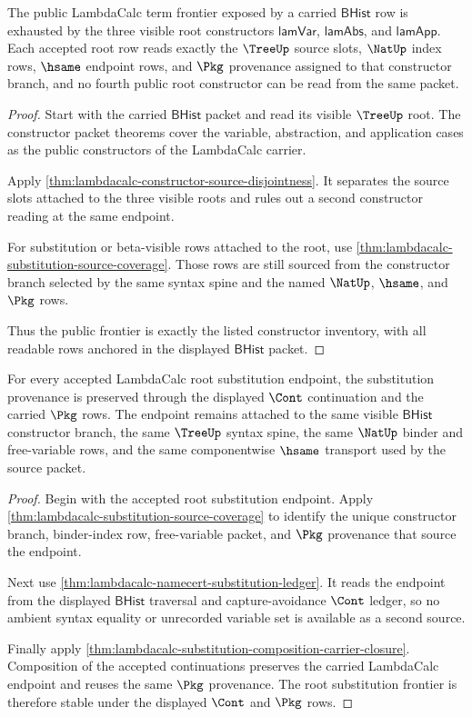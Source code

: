 \begin{theorem}
\label{thm:lambdacalc-root-constructor-frontier}
The public LambdaCalc term frontier exposed by a carried $\mathsf{BHist}$ row is
exhausted by the three visible root constructors
$\mathsf{lamVar}$, $\mathsf{lamAbs}$, and $\mathsf{lamApp}$. Each accepted root
row reads exactly the $\TreeUp$ source slots, $\NatUp$ index rows, $\hsame$
endpoint rows, and $\Pkg$ provenance assigned to that constructor branch, and no
fourth public root constructor can be read from the same packet.
\end{theorem}
\begin{proof}
Start with the carried $\mathsf{BHist}$ packet and read its visible $\TreeUp$
root. The constructor packet theorems cover the variable, abstraction, and
application cases as the public constructors of the LambdaCalc carrier.

Apply \autoref{thm:lambdacalc-constructor-source-disjointness}. It separates the
source slots attached to the three visible roots and rules out a second
constructor reading at the same endpoint.

For substitution or beta-visible rows attached to the root, use
\autoref{thm:lambdacalc-substitution-source-coverage}. Those rows are still
sourced from the constructor branch selected by the same syntax spine and the
named $\NatUp$, $\hsame$, and $\Pkg$ rows.

Thus the public frontier is exactly the listed constructor inventory, with all
readable rows anchored in the displayed $\mathsf{BHist}$ packet.
\end{proof}

\begin{theorem}
\label{thm:lambdacalc-root-substitution-frontier}
For every accepted LambdaCalc root substitution endpoint, the substitution
provenance is preserved through the displayed $\Cont$ continuation and the
carried $\Pkg$ rows. The endpoint remains attached to the same visible
$\mathsf{BHist}$ constructor branch, the same $\TreeUp$ syntax spine, the same
$\NatUp$ binder and free-variable rows, and the same componentwise $\hsame$
transport used by the source packet.
\end{theorem}
\begin{proof}
Begin with the accepted root substitution endpoint. Apply
\autoref{thm:lambdacalc-substitution-source-coverage} to identify the unique
constructor branch, binder-index row, free-variable packet, and $\Pkg$
provenance that source the endpoint.

Next use \autoref{thm:lambdacalc-namecert-substitution-ledger}. It reads the
endpoint from the displayed $\mathsf{BHist}$ traversal and capture-avoidance
$\Cont$ ledger, so no ambient syntax equality or unrecorded variable set is
available as a second source.

Finally apply
\autoref{thm:lambdacalc-substitution-composition-carrier-closure}. Composition
of the accepted continuations preserves the carried LambdaCalc endpoint and
reuses the same $\Pkg$ provenance. The root substitution frontier is therefore
stable under the displayed $\Cont$ and $\Pkg$ rows.
\end{proof}

